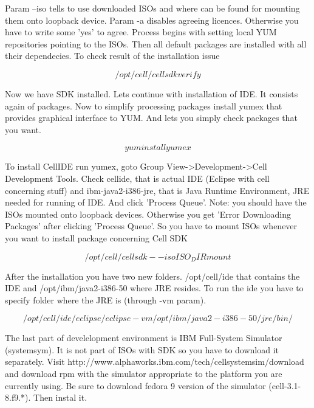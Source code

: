 Param --iso tells to use downloaded ISOs and where can be found for mounting them onto loopback device. Param -a disables agreeing licences. Otherwise you have to write some 'yes' to agree. Process begins with setting local YUM repositories pointing to the ISOs. Then all default packages are installed with all their dependecies. To check result of the installation issue

\begin{equation}
/opt/cell/cellsdk verify
\end{equation}

Now we have SDK installed. Lets continue with installation of IDE. It consists again of packages. Now to simplify processing packages install yumex that provides graphical interface to YUM. And lets you simply check packages that you want.

\begin{equation}
yum install yumex
\end{equation}

To install CellIDE run yumex, goto Group View->Development->Cell Development Tools. Check cellide, that is actual IDE (Eclipse with cell concerning stuff) and ibm-java2-i386-jre, that is Java Runtime Environment, JRE needed for running of IDE. And click 'Process Queue'. Note: you should have the ISOs mounted onto loopback devices. Otherwise you get 'Error Downloading Packages' after clicking 'Process Queue'. So you have to mount ISOs whenever you want to install package concerning Cell SDK

\begin{equation}
/opt/cell/cellsdk --iso ISO_DIR mount
\end{equation}

After the installation you have two new folders. /opt/cell/ide that contains the IDE and /opt/ibm/java2-i386-50 where JRE resides. To run the ide you have to specify folder where the JRE is (through -vm param).

\begin{equation}
/opt/cell/ide/eclipse/eclipse -vm /opt/ibm/java2-i386-50/jre/bin/
\end{equation}

The last part of develelopment environment is IBM Full-System Simulator (systemsym). It is not part of ISOs with SDK so you have to download it separately. Visit http://www.alphaworks.ibm.com/tech/cellsystemsim/download and download rpm with the simulator appropriate to the platform you are currently using. Be sure to download fedora 9 version of the simulator (cell-3.1-8.f9.*). Then instal it.

